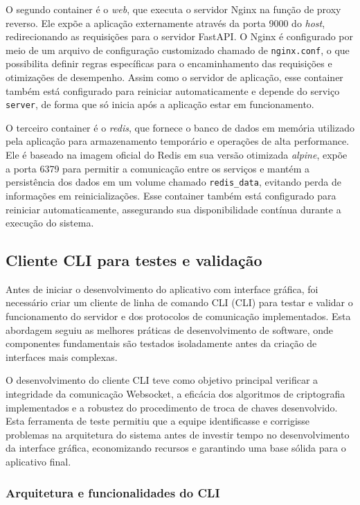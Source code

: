 O segundo container é o \textit{web}, que executa o servidor Nginx na
função de proxy reverso. Ele expõe a aplicação externamente através
da porta 9000 do \textit{host}, redirecionando as requisições para o servidor
FastAPI. O Nginx é configurado por meio de um arquivo de configuração
customizado chamado de \texttt{nginx.conf}, o que possibilita definir regras
específicas para o encaminhamento das requisições e otimizações de
desempenho. Assim como o servidor de aplicação, esse container também
está configurado para reiniciar automaticamente e depende do serviço
\texttt{server}, de forma que só inicia após a aplicação estar em funcionamento.

O terceiro container é o \textit{redis}, que fornece o banco de dados em
memória utilizado pela aplicação para armazenamento temporário e
operações de alta performance. Ele é baseado na imagem oficial do
Redis em sua versão otimizada \textit{alpine}, expõe a porta 6379 para
permitir a comunicação entre os serviços e mantém a persistência dos
dados em um volume chamado \texttt{redis\_data}, evitando perda de
informações em reinicializações. Esse container também está
configurado para reiniciar automaticamente, assegurando sua
disponibilidade contínua durante a execução do sistema.

\subsection{Cliente \acs{CLI} para testes e validação}

Antes de iniciar o desenvolvimento do aplicativo com interface
gráfica, foi necessário criar um cliente de linha de comando \acs{CLI}
(\acl{CLI}) para testar e validar o funcionamento do
servidor e dos protocolos de comunicação implementados. Esta
abordagem seguiu as melhores práticas de desenvolvimento de software,
onde componentes fundamentais são testados isoladamente antes da
criação de interfaces mais complexas.

O desenvolvimento do cliente \acs{CLI} teve como objetivo principal
verificar a integridade da comunicação Websocket, a eficácia dos
algoritmos de criptografia implementados e a robustez do procedimento
de troca de chaves desenvolvido. Esta ferramenta de teste permitiu
que a equipe identificasse e corrigisse problemas na arquitetura do
sistema antes de investir tempo no desenvolvimento da interface
gráfica, economizando recursos e garantindo uma base sólida para o
aplicativo final.

\subsubsection{Arquitetura e funcionalidades do \acs{CLI}}

